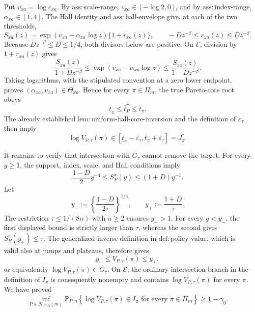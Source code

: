 Put \(v_{xa}=\log c_{xa}\).  By \(\mathrm{ass{:}scale\text{-}range}\), \(v_{xa}\in[-\log2,0]\), and by \(\mathrm{ass{:}index\text{-}range}\), \(\alpha_{xa}\in[1,4]\).  The Hall identity and \(\mathrm{ass{:}hall\text{-}envelope}\) give, at each of the two thresholds,
\[
 S_{xa}(z)=\exp(v_{xa}-\alpha_{xa}\log z)\{1+r_{xa}(z)\},
 \qquad -Dz^{-\beta}\leq r_{xa}(z)\leq Dz^{-\beta}.
\]
Because \(Dz^{-\beta}\leq D\leq1/4\), both divisors below are positive.  On \(\mathcal E\), division by \(1+r_{xa}(z)\) gives
\[
 \frac{\underline S_{xa}(z)}{1+Dz^{-\beta}}
 \leq \exp(v_{xa}-\alpha_{xa}\log z)
 \leq \frac{\overline S_{xa}(z)}{1-Dz^{-\beta}}.
\]
Taking logarithms, with the stipulated convention at a zero lower endpoint, proves \((\alpha_{xa},v_{xa})\in\Theta_{xa}\).  Hence for every \(\pi\in\Pi_m\), the true Pareto-core root obeys
\[
 \underline t_\pi\leq\bar t_P^\pi\leq\overline t_\pi.
\]
The already established \(\mathrm{lem{:}uniform\text{-}hall\text{-}core\text{-}inversion}\) and the definition of \(\varepsilon_\tau\) then imply
\[
 \log V_{P,\tau}(\pi)
 \in[\underline t_\pi-\varepsilon_\tau,
      \overline t_\pi+\varepsilon_\tau]
 =J^*_{\pi}.
\]

It remains to verify that intersection with \(G_\tau\) cannot remove the target.  For every \(y\geq1\), the support, index, scale, and Hall conditions imply
\[
 \frac{1-D}{2}y^{-4}
 \leq S_P^\pi(y)
 \leq (1+D)y^{-1}.
\]
Let
\[
 y_-:=\left\{\frac{1-D}{2\tau}\right\}^{1/4},
 \qquad y_+:=\frac{1+D}{\tau}.
\]
The restriction \(\tau\leq1/(8n)\) with \(n\geq2\) ensures \(y_->1\).  For every \(y<y_-\), the first displayed bound is strictly larger than \(\tau\), whereas the second gives \(S_P^\pi(y_+)\leq\tau\).  The generalized-inverse definition in \(\mathrm{def{:}policy\text{-}value}\), which is valid also at jumps and plateaus, therefore gives
\[
 y_-\leq V_{P,\tau}(\pi)\leq y_+,
\]
or equivalently \(\log V_{P,\tau}(\pi)\in G_\tau\).  On \(\mathcal E\), the ordinary intersection branch in the definition of \(I_\pi\) is consequently nonempty and contains \(\log V_{P,\tau}(\pi)\) for every \(\pi\).  We have proved
\[
 \inf_{P\in\mathcal H_{\beta,D}(m)}
 \mathbb P_{P,n}\!\left\{\log V_{P,\tau}(\pi)\in I_\pi
 \text{ for every }\pi\in\Pi_m\right\}
 \geq1-\gamma_0.
\]

